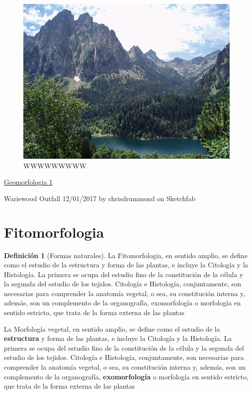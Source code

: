 \documentclass[16pt,]{krantz}
\theoremstyle{definition}
\newtheorem{definition}{Definición}[chapter]
\theoremstyle{definition}
\theoremstyle{definition}
\theoremstyle{definition}
\theoremstyle{remark}
\begin{document}
\begin{figure}[!ht]

{\centering \includegraphics{geomorfo} 

}

\caption{WWWWWWWWW}\label{fig:wwUUU}
\end{figure}

\href{https://sketchfab.com/3d-models/eldgos-i-geldingadolum-a-reykjanesskaga-7bcb3d856e1947a4a78c1810f559b3ea}{Geomorfologia 1}

Wariewood Outfall 12/01/2017 by chrisdrummond on Sketchfab

\hypertarget{fitomorfologia}{%
\section{Fitomorfologia}\label{fitomorfologia}}

\begin{definition}[Formas naturales]
\protect\hypertarget{def:ww3}{}{\label{def:ww3} {} }La Fitomorfologia, en sentido amplio, se define como el estudio de la estructura y forma de las plantas, e incluye la Citología y la Histología. La primera se ocupa del estudio fino de la constitución de la célula y la segunda del estudio de los tejidos. Citología e Histología, conjuntamente, son necesarias para comprender la anatomía vegetal, o sea, su constitución interna y, además, son un complemento de la organografía, exomorfología o morfología en sentido estricto, que trata de la forma externa de las plantas
\end{definition}
La Morfología vegetal, en sentido amplio, se define como el estudio de la \textbf{estructura} y forma de las plantas, e incluye la Citología y la Histología. La primera se ocupa del estudio fino de la constitución de la célula y la segunda del estudio de los tejidos. Citología e Histología, conjuntamente, son necesarias para comprender la anatomía vegetal, o sea, su constitución interna y, además, son un complemento de la organografía, \textbf{exomorfología} o morfología en sentido estricto, que trata de la forma externa de las plantas
\end{document}
